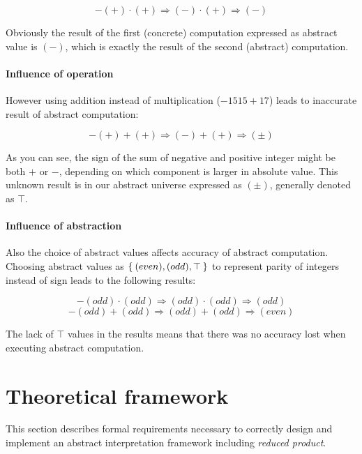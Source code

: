 \documentclass[12pt,oneside]{fithesis2}
\theoremstyle{definition}
\begin{document}
\[ -(+) \cdot (+) \Rightarrow (-) \cdot (+) \Rightarrow (-) \]

Obviously the result of the first (concrete) computation expressed as abstract value is $(-)$, which is exactly the result of the second (abstract) computation.

\paragraph{Influence of operation}
However using addition instead of multiplication ($-1515 + 17$) leads to inaccurate result of abstract computation:

\[ -(+) + (+) \Rightarrow (-) + (+) \Rightarrow (\pm) \]

As you can see, the sign of the sum of negative and positive integer might be both $+$ or $-$, depending on which component is larger in absolute value. This unknown result is in our abstract universe expressed as $(\pm)$, generally denoted as $\top$.

\paragraph{Influence of abstraction}
Also the choice of abstract values affects accuracy of abstract computation. Choosing abstract values as $\Set{(even), (odd), \top}$ to represent parity of integers instead of sign leads to the following results:

\[ -(odd) \cdot (odd) \Rightarrow (odd) \cdot (odd) \Rightarrow (odd) \]
\[ -(odd) + (odd) \Rightarrow (odd) + (odd) \Rightarrow (even) \]

The lack of $\top$ values in the results means that there was no accuracy lost when executing abstract computation.

\section{Theoretical framework}

This section describes formal requirements necessary to correctly design and implement an abstract interpretation framework including \textit{reduced product}.
\end{document}

